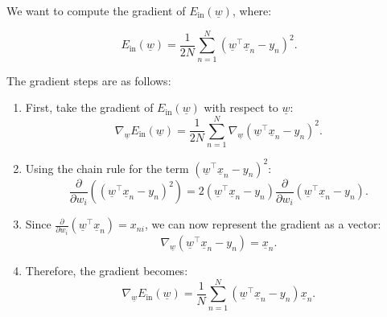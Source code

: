 \begin{example}
    We want to compute the gradient of \( E_{\text{in}}(\underline{w}) \), where:

    \[
    E_{\text{in}}(\underline{w}) = \frac{1}{2N} \sum_{n=1}^{N} \left( \underline{w}^\top \underline{x}_n - y_n \right)^2.
    \]

    The gradient steps are as follows:

    \begin{enumerate}
        \item First, take the gradient of \( E_{\text{in}}(\underline{w}) \) with respect to \( \underline{w} \):
        \[
        \nabla_{\underline{w}} E_{\text{in}}(\underline{w}) = \frac{1}{2N} \sum_{n=1}^{N} \nabla_{\underline{w}} \left( \underline{w}^\top \underline{x}_n - y_n \right)^2.
        \]

        \item Using the chain rule for the term \( \left( \underline{w}^\top \underline{x}_n - y_n \right)^2 \):
        \[
        \frac{\partial}{\partial w_i} \left( \left( \underline{w}^\top \underline{x}_n - y_n \right)^2 \right) = 2 \left( \underline{w}^\top \underline{x}_n - y_n \right) \frac{\partial}{\partial w_i} \left( \underline{w}^\top \underline{x}_n - y_n \right).
        \]

        \item Since \( \frac{\partial}{\partial w_i} \left( \underline{w}^\top \underline{x}_n \right) = x_{ni} \), we can now represent the gradient as a vector:
        \[
        \nabla_{\underline{w}} \left( \underline{w}^\top \underline{x}_n - y_n \right) = \underline{x}_n.
        \]

        \item Therefore, the gradient becomes:
        \[
        \nabla_{\underline{w}} E_{\text{in}}(\underline{w}) = \frac{1}{N} \sum_{n=1}^{N} \left( \underline{w}^\top \underline{x}_n - y_n \right) \underline{x}_n.
        \]
    \end{enumerate}
\end{example}


